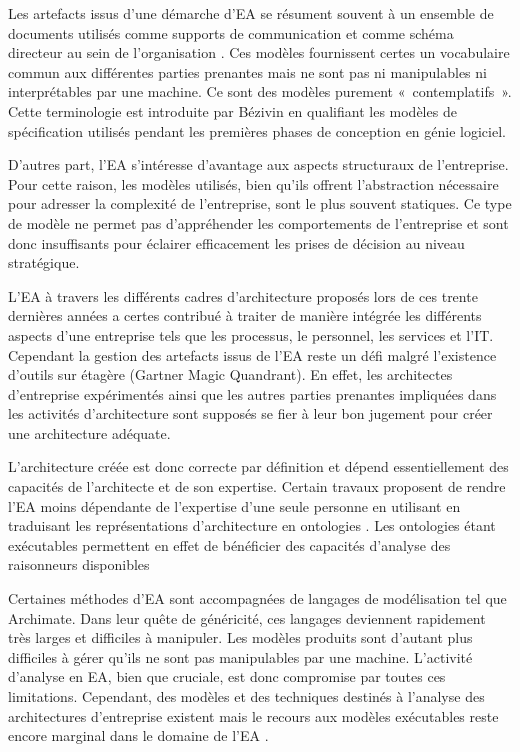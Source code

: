 Les artefacts issus d'une démarche d'EA se résument souvent à un ensemble de documents utilisés comme supports de communication et comme schéma directeur au sein de l'organisation \cite{kulkarni_modelling_2013} \cite{clark_towards_2014}. Ces modèles fournissent certes un vocabulaire commun aux différentes parties prenantes mais ne sont pas ni manipulables ni interprétables par une machine. Ce sont des modèles purement «~contemplatifs~». Cette terminologie est introduite par Bézivin en qualifiant les modèles de spécification utilisés pendant les premières phases de conception en génie logiciel. 

D'autres part, l'EA s'intéresse d'avantage aux aspects structuraux de l'entreprise. Pour cette raison, les modèles utilisés, bien qu'ils offrent l'abstraction nécessaire pour adresser la complexité de l'entreprise, sont le plus souvent statiques. Ce type de modèle ne permet pas d'appréhender les comportements de l'entreprise et sont donc insuffisants pour éclairer efficacement les prises de décision au niveau stratégique.

L'EA à travers les différents cadres d'architecture proposés lors de ces trente dernières années a certes contribué à traiter de manière intégrée les différents aspects d'une entreprise tels que les processus, le personnel, les services et l'IT. Cependant la gestion des artefacts issus de l'EA reste un défi \cite{zachman1997enterprise} malgré l'existence d'outils sur étagère (Gartner Magic Quandrant). En effet, les architectes d'entreprise expérimentés ainsi que les autres parties prenantes impliquées dans les activités d'architecture sont supposés se fier à leur bon jugement pour créer une architecture adéquate. 

L'architecture créée est donc correcte par définition et dépend essentiellement des capacités de l'architecte et de son expertise. Certain travaux proposent de rendre l'EA moins dépendante de l'expertise d'une seule personne en utilisant en traduisant les représentations d'architecture en ontologies \cite{sunkle_analyzing_2013}. Les ontologies étant exécutables permettent en effet de bénéficier des capacités d'analyse des raisonneurs disponibles 

Certaines méthodes d'EA sont accompagnées de langages de modélisation tel que Archimate. Dans leur quête de généricité, ces langages deviennent rapidement très larges et difficiles à manipuler. Les modèles produits sont d'autant plus difficiles à gérer qu'ils ne sont pas manipulables par une machine. L'activité d'analyse en EA, bien que cruciale, est donc compromise par toutes ces limitations. Cependant, des modèles et des techniques destinés à l'analyse des architectures d'entreprise existent mais le recours aux modèles exécutables reste encore marginal dans le domaine de l'EA \cite{kulkarni2013modelling}.


